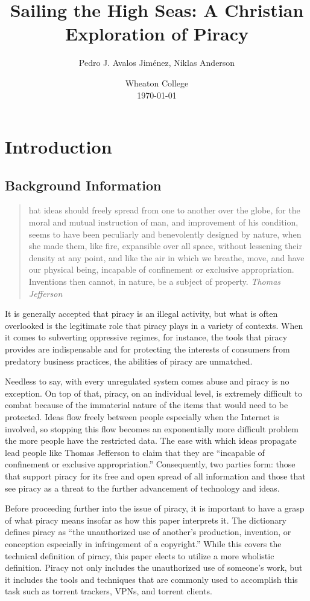 \documentclass[onecolumn, 12pt]{article}
\title{Sailing the High Seas: A Christian Exploration of Piracy}
\author{Pedro J. Avalos Jim\'enez, Niklas Anderson}
\date{Wheaton College\\\today}
\begin{document}
\maketitle

\section{Introduction}

\subsection{Background Information}
\blockcquote{barlow:wine}{%
  hat ideas should freely spread from one to another over the globe,
  for the moral and mutual instruction of man, and improvement of his
  condition, seems to have been peculiarly and benevolently designed by nature,
  when she made them, like fire, expansible over all space, without lessening
  their density at any point, and like the air in which we breathe, move, and
  have our physical being, incapable of confinement or exclusive appropriation.
  Inventions then cannot, in nature, be a subject of property.
  \emph{Thomas Jefferson}%
}

It is generally accepted that piracy is an illegal activity, but what is often overlooked
is the legitimate role that piracy plays in a variety of contexts. When it comes to
subverting oppressive regimes, for instance, the tools that piracy provides are
indispensable and for protecting the interests of consumers from predatory business
practices, the abilities of piracy are unmatched. 

Needless to say, with every unregulated system comes abuse and piracy is no exception.
On top of that, piracy, on an individual level, is extremely difficult to combat because
of the immaterial nature of the items that would need to be protected. Ideas flow freely
between people especially when the Internet is involved, so stopping this flow becomes an
exponentially more difficult problem the more people have the restricted data. The ease
with which ideas propagate lead people like Thomas Jefferson to claim that they are
``incapable of confinement or exclusive appropriation.'' Consequently, two parties form:
those that support piracy for its free and open spread of all information and those that
see piracy as a threat to the further advancement of technology and ideas.

Before proceeding further into the issue of piracy, it is important to have a grasp of
what piracy means insofar as how this paper interprets it. The dictionary defines piracy
as ``the unauthorized use of another's production, invention, or conception especially in
infringement of a copyright.'' While this covers the technical definition of piracy, this
paper elects to utilize a more wholistic definition. Piracy not only includes the
unauthorized use of someone's work, but it includes the tools and techniques that are
commonly used to accomplish this task such as torrent trackers, VPNs, and torrent clients.
\end{document}
